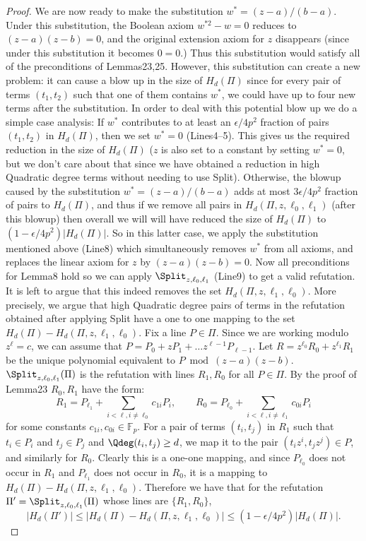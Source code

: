 \begin{proof}
We are now ready to make the substitution $w^*=(z-a)/(b-a)$. Under this substitution, the Boolean axiom $w^{*2}-w=0$ reduces to $(z-a)(z-b)=0$, and the original extension axiom for $z$ disappears (since under this substitution it becomes $0=0$.) Thus this substitution would satisfy all of the preconditions of Lemmas23,25. However, this substitution can create a new problem: it can cause a blow up in the size of $H_d(\Pi)$ since for every pair of terms $(t_1,t_2)$ such that one of them contains $w^*$, we could have up to four new terms after the substitution. In order to deal with this potential blow up we do a simple case analysis: If $w^*$ contributes to at least an $\epsilon/4p^2$ fraction of pairs $(t_1,t_2)$ in $H_d(\Pi)$, then we set $w^*=0$ (Lines4–5). This gives us the required reduction in the size of $H_d(\Pi)$ ($z$ is also set to a constant by setting $w^*=0$, but we don't care about that since we have obtained a reduction in high Quadratic degree terms without needing to use Split). Otherwise, the blowup caused by the substitution $w^*=(z-a)/(b-a)$ adds at most $3\epsilon/4p^2$ fraction of pairs to $H_d(\Pi)$, and thus if we remove all pairs in $H_d(\Pi,z,\ell_0,\ell_1)$ (after this blowup) then overall we will will have reduced the size of $H_d(\Pi)$ to $(1-\epsilon/4p^2)|H_d(\Pi)|$. So in this latter case, we apply the substitution mentioned above (Line8) which simultaneously removes $w^*$ from all axioms, and replaces the linear axiom for $z$ by $(z-a)(z-b)=0$. Now all preconditions for Lemma8 hold so we can apply $\Split_{z,\ell_0,\ell_1}$ (Line9) to get a valid refutation. It is left to argue that this indeed removes the set $H_d(\Pi,z,\ell_1,\ell_0)$. More precisely, we argue that high Quadratic degree pairs of terms in the refutation obtained after applying Split have a one to one mapping to the set $H_d(\Pi)-H_d(\Pi,z,\ell_1,\ell_0)$. Fix a line $P\in\Pi$. Since we are working modulo $z^{\ell}=c$, we can assume that $P=P_0+zP_1+\ldots z^{\ell-1}P_{\ell-1}$. Let $R=z^{\ell_0}R_0+z^{\ell_1}R_1$ be the unique polynomial equivalent to $P\bmod(z-a)(z-b)$. $\Split_{z,\ell_0,\ell_1}(\Pi)$ is the refutation with lines $R_1,R_0$ for all $P\in\Pi$. By the proof of Lemma23 $R_0,R_1$ have the form:
\[R_1=P_{\ell_1}+\sum_{i<\ell,i\neq\ell_0}c_{1i}P_i,\qquad R_0=P_{\ell_0}+\sum_{i<\ell,i\neq\ell_1}c_{0i}P_i\]
for some constants $c_{1i},c_{0i}\in\mathbb F_p$.
For a pair of terms $(t_i,t_j)$ in $R_1$ such that $t_i\in P_i$ and $t_j\in P_j$ and $\Qdeg(t_i,t_j)\geq d$, we map it to the pair $(t_iz^i,t_jz^j)\in P$, and similarly for $R_0$. Clearly this is a one-one mapping, and since $P_{\ell_0}$ does not occur in $R_1$ and $P_{\ell_1}$ does not occur in $R_0$, it is a mapping to $H_d(\Pi)-H_d(\Pi,z,\ell_1,\ell_0)$. Therefore we have that for the refutation $\Pi'=\Split_{z,\ell_0,\ell_1}(\Pi)$ whose lines are $\{R_1,R_0\}$,
\[|H_d(\Pi')|\leq|H_d(\Pi)-H_d(\Pi,z,\ell_1,\ell_0)|\leq(1-\epsilon/4p^2)|H_d(\Pi)|.\]
\end{proof}
